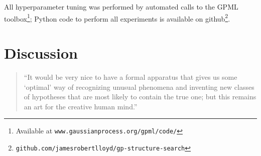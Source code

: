\documentclass[twoside]{article}
\renewcommand{\TBD}[1]{}
\begin{document}
All \gp{} hyperparameter tuning was performed by automated calls to the GPML toolbox\footnote{Available at \texttt{www.gaussianprocess.org/gpml/code/}}; Python code to perform all experiments is available on github\footnote{\texttt{github.com/jamesrobertlloyd/gp-structure-search}}.



\section{Discussion}

\begin{quotation}
``It would be very nice to have a formal apparatus that gives us some `optimal' way of recognizing unusual phenomena and inventing new classes of hypotheses that are most likely to contain the true one; but this remains an art for the creative human mind.''

\hspace*{\fill}


\end{quotation}
\end{document}
